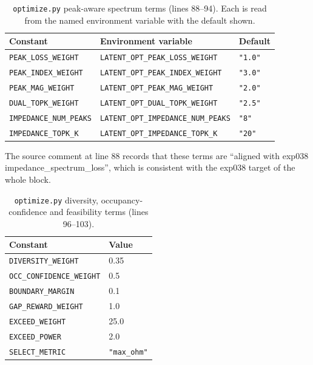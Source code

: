 \begin{table}[htbp]
\centering
\caption{\texttt{optimize.py} peak-aware spectrum terms (lines 88--94). Each is read from
the named environment variable with the default shown.}
\label{tab:appb_opt_peak}
\begin{tabular}{@{}lll@{}}
\hline
Constant & Environment variable & Default \\
\hline
\texttt{PEAK\_LOSS\_WEIGHT} & \texttt{LATENT\_OPT\_PEAK\_LOSS\_WEIGHT} & \texttt{"1.0"} \\
\texttt{PEAK\_INDEX\_WEIGHT} & \texttt{LATENT\_OPT\_PEAK\_INDEX\_WEIGHT} & \texttt{"3.0"} \\
\texttt{PEAK\_MAG\_WEIGHT} & \texttt{LATENT\_OPT\_PEAK\_MAG\_WEIGHT} & \texttt{"2.0"} \\
\texttt{DUAL\_TOPK\_WEIGHT} & \texttt{LATENT\_OPT\_DUAL\_TOPK\_WEIGHT} & \texttt{"2.5"} \\
\texttt{IMPEDANCE\_NUM\_PEAKS} & \texttt{LATENT\_OPT\_IMPEDANCE\_NUM\_PEAKS} & \texttt{"8"} \\
\texttt{IMPEDANCE\_TOPK\_K} & \texttt{LATENT\_OPT\_IMPEDANCE\_TOPK\_K} & \texttt{"20"} \\
\hline
\end{tabular}
\end{table}

The source comment at line 88 records that these terms are ``aligned with exp038
impedance\_spectrum\_loss'', which is consistent with the exp038 target of the whole
block.

\begin{table}[htbp]
\centering
\caption{\texttt{optimize.py} diversity, occupancy-confidence and feasibility terms
(lines 96--103).}
\label{tab:appb_opt_feasibility}
\begin{tabular}{@{}ll@{}}
\hline
Constant & Value \\
\hline
\texttt{DIVERSITY\_WEIGHT} & 0.35 \\
\texttt{OCC\_CONFIDENCE\_WEIGHT} & 0.5 \\
\texttt{BOUNDARY\_MARGIN} & 0.1 \\
\texttt{GAP\_REWARD\_WEIGHT} & 1.0 \\
\texttt{EXCEED\_WEIGHT} & 25.0 \\
\texttt{EXCEED\_POWER} & 2.0 \\
\texttt{SELECT\_METRIC} & \texttt{"max\_ohm"} \\
\hline
\end{tabular}
\end{table}


